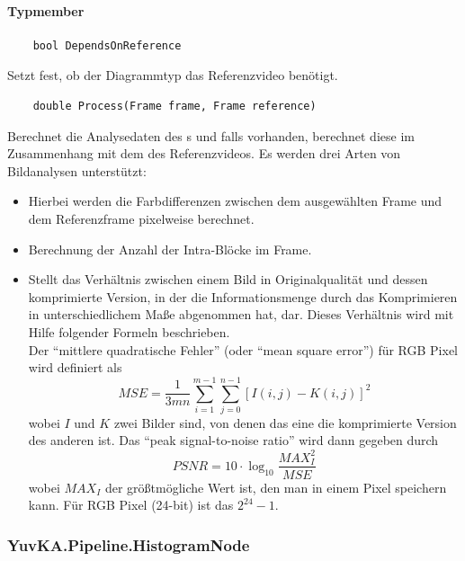 \paragraph{Typmember}
\begin{itemize}

	\begin{verbatim}
	bool DependsOnReference
	\end{verbatim}
	Setzt fest, ob der Diagrammtyp das Referenzvideo benötigt.
	
	\begin{verbatim}
	double Process(Frame frame, Frame reference)
	\end{verbatim}
	Berechnet die Analysedaten des s und falls vorhanden, berechnet diese im Zusammenhang mit dem  des Referenzvideos. Es werden drei Arten von Bildanalysen unterstützt:
		\begin{itemize}
			\item {} Hierbei werden die Farbdifferenzen zwischen dem ausgewählten Frame und dem Referenzframe pixelweise berechnet.
			\item {} Berechnung der Anzahl der Intra-Blöcke im Frame.
			\item {} Stellt das Verhältnis zwischen einem Bild in Originalqualität und dessen komprimierte Version, in der die Informationsmenge durch das Komprimieren in unterschiedlichem Maße abgenommen hat, dar. Dieses Verhältnis wird mit Hilfe folgender Formeln beschrieben. \\
			Der ``mittlere quadratische Fehler'' (oder ``mean square error'') für RGB Pixel wird definiert als 
			\[ MSE = \frac{1}{3mn} \sum_{i = 1}^{m - 1}{ \sum_{j = 0}^{n - 1}{[I(i, j) - K(i, j)]^2} } \]
			wobei $ I $ und $ K $ zwei Bilder sind, von denen das eine die komprimierte Version des anderen ist. Das ``peak signal-to-noise ratio'' wird dann gegeben durch
			\[ PSNR = 10 \cdot \log_{10}{\frac{MAX_I^2}{MSE}} \]
			wobei $ MAX_I $ der größtmögliche Wert ist, den man in einem Pixel speichern kann. Für RGB Pixel (24-bit) ist das $ 2^{24} - 1 $.
		\end{itemize}
		
\end{itemize}

\subsubsection{YuvKA.Pipeline.HistogramNode}

